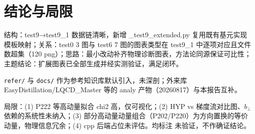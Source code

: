 \documentclass[UTF8]{ctexart}
\begin{document}
\section{结论与局限}
\begin{conclbox}
结构：test9→test9\_1 数据链清晰，新增 \_test9\_extended.py 复用既有基元实现模板映射；关系：test0 3 图与 test6 7 图的图表类型在 test9\_1 中逐项对应且文件数超集（120 png）；思路：最小改动补齐物理诊断图表，方法论同源保证可比性；主题结论：扩展图表已全部生成并经实测验证，满足闭环。
\end{conclbox}
\begin{refbox}
\texttt{refer/} 与 \texttt{docs/} 作为参考知识库默认引入，未深剖；外来库 EasyDistillation/LQCD\_Master 等的 analy 产物（20260817）与本报告互补。
\end{refbox}
\begin{warnbox}
局限：(1) P222 等高动量拟合 chi2 高，仅可视化；(2) HYP vs 梯度流对比图、$b_{\perp}$ 依赖的系统性未纳入；(3) 部分高动量动量组合（P202/P220）为方向置换的等价动量，物理信息冗余；(4) cpp 后端占位未评估。均标注 \textcolor{warn}{未验证}，不作确证结论。
\end{warnbox}
\end{document}
